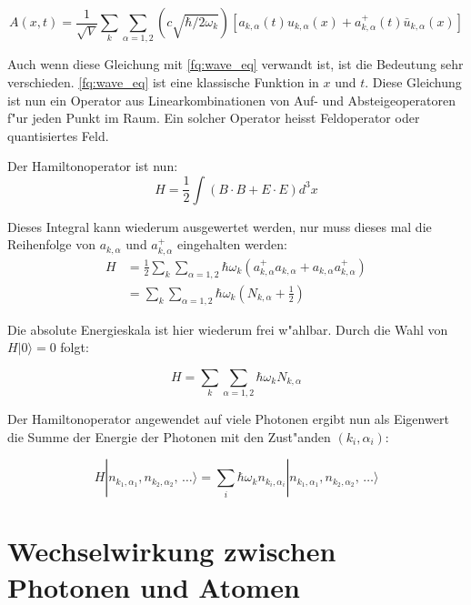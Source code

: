 \begin{equation}
A(x,t) = \frac{1}{\sqrt{V}} \sum_k \sum_{\alpha=1,2} \left(c \sqrt{\hbar/2 \omega_k}\right)\left[a_{k,\alpha}(t) u_{k,\alpha}(x) + a^+_{k,\alpha}(t) \bar{u}_{k,\alpha}(x) \right]
\end{equation}

Auch wenn diese Gleichung mit \ref{fq:wave_eq} verwandt ist, ist die Bedeutung sehr verschieden. \ref{fq:wave_eq} ist eine klassische Funktion in $x$ und $t$. Diese Gleichung ist nun ein Operator aus Linearkombinationen von Auf- und Absteigeoperatoren f"ur jeden Punkt im Raum. Ein solcher Operator heisst Feldoperator oder quantisiertes Feld.

Der Hamiltonoperator ist nun:
\begin{equation}
H = \frac{1}{2} \int (B \cdot B + E \cdot E) d^3 x
\end{equation}

Dieses Integral kann wiederum ausgewertet werden, nur muss dieses mal die Reihenfolge von $a_{k,\alpha}$ und $a^+_{k,\alpha}$ eingehalten werden:
\begin{equation}
\begin{split}
H &= \frac{1}{2} \sum_k \sum_{\alpha=1,2} \hbar \omega_k (a^+_{k,\alpha} a_{k,\alpha} + a_{k,\alpha} a^+_{k,\alpha}) \\
&= \sum_k \sum_{\alpha=1,2} \hbar \omega_k (N_{k,\alpha} + \frac{1}{2} )
\end{split}
\end{equation}

Die absolute Energieskala ist hier wiederum frei w"ahlbar. Durch die Wahl von $H|0\rangle = 0$ folgt:

\begin{equation}
H = \sum_k \sum_{\alpha=1,2} \hbar \omega_k N_{k,\alpha}
\end{equation}

Der Hamiltonoperator angewendet auf viele Photonen ergibt nun als Eigenwert die Summe der Energie der Photonen mit den Zust"anden $(k_i,\alpha_i)$:

\begin{equation}
H |n_{k_1,\alpha_1}, n_{k_2,\alpha_2}, \, \hdots\rangle = \sum_i \hbar \omega_k n_{k_i,\alpha_i} |n_{k_1,\alpha_1}, n_{k_2,\alpha_2}, \, \hdots\rangle
\end{equation}

\section{Wechselwirkung zwischen Photonen und Atomen}

